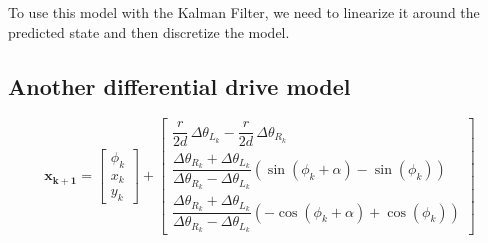 \documentclass[12pt]{article}
\begin{document}
 To use this model with the Kalman Filter, we need to linearize it around 
 the predicted state and then discretize the model.

 \subsection{Another differential drive model}
 \renewcommand{\arraystretch}{1.5}
 \begin{equation}
     \mathbf{x_{k+1}} = \begin{bmatrix}
         \phi_k \\ x_k \\ y_k
     \end{bmatrix} + 
     \begin{bmatrix}
         \dfrac{r}{2d}\,\Delta\theta_{L_k} - \dfrac{r}{2d} \,\Delta\theta_{R_k} \\
         \dfrac{\Delta\theta_{R_k} + \Delta\theta_{L_k}}{\Delta\theta_{R_k} - \Delta\theta_{L_k}}\left( \sin(\phi_k + \alpha) - \sin(\phi_k) \right) \\
         \dfrac{\Delta\theta_{R_k} + \Delta\theta_{L_k}}{\Delta\theta_{R_k} - \Delta\theta_{L_k}}\left( -\cos(\phi_k + \alpha) + \cos(\phi_k) \right) 
     \end{bmatrix}
 \end{equation}
 \renewcommand{\arraystretch}{1}
\end{document}
